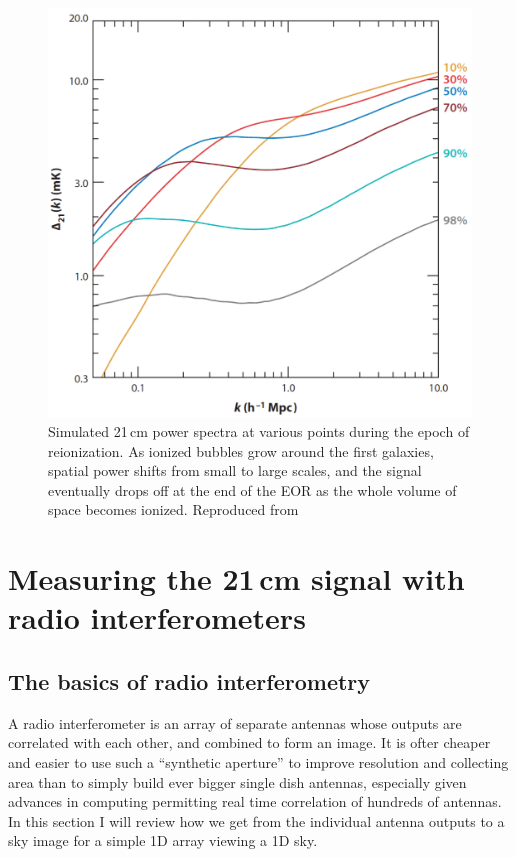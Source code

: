 {\begin{figure}
	\centering
	\includegraphics[width=4.5in]{chap0_intro/FiducialPS.png}
	\caption[Simulated 21\,cm power spectra at various points during the epoch of reionization.]{Simulated 21\,cm power spectra at various points during the epoch of reionization. As ionized bubbles grow around the first galaxies, spatial power shifts from small to large scales, and the signal eventually drops off at the end of the EOR as the whole volume of space becomes ionized. Reproduced from \citet{BarkanaPS2009}}
	\label{fig:fiducialPS}
\end{figure}

\section{Measuring the 21\,cm signal with radio interferometers}

\subsection{The basics of radio interferometry}

A radio interferometer is an array of separate antennas whose outputs are correlated with each other, and combined to form an image. It is ofter cheaper and easier to use such a ``synthetic aperture'' to improve resolution and collecting area than to simply build ever bigger single dish antennas, especially given advances in computing permitting real time correlation of hundreds of antennas. In this section I will review how we get from the individual antenna outputs to a sky image for a simple 1D array viewing a 1D sky.

}
